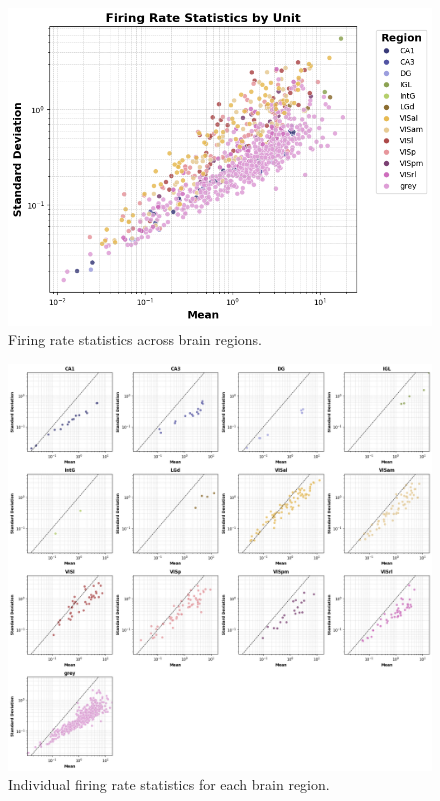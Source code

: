 \documentclass[10pt,twocolumn]{article}
\begin{document}
\begin{figure}[ht]
\centering
\includegraphics[width=\linewidth]{report_images/unit_firing_rate_statistics.png}
\caption{Firing rate statistics across brain regions.}
\label{fig:firing_rate_stats}
\end{figure}

\begin{figure}[H]
\centering
\includegraphics[width=\linewidth]{report_images/unit_firing_rate_statistics_single.png}
\caption{Individual firing rate statistics for each brain region.}
\label{fig:firing_rate_single}
\end{figure}
\end{document}
